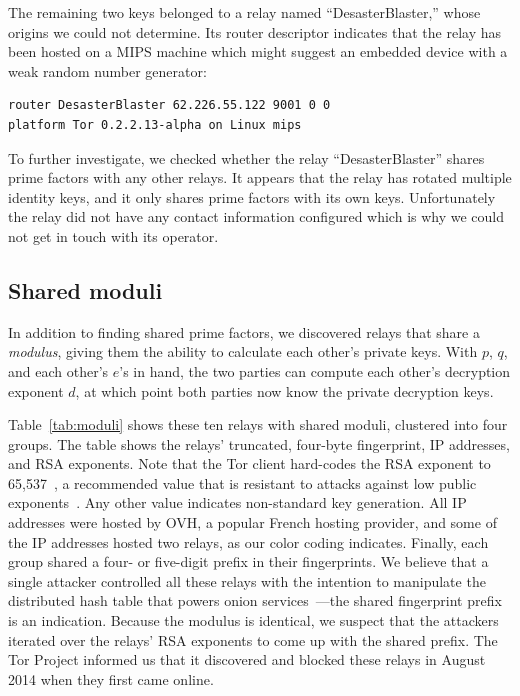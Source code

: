 The remaining two keys belonged to a relay named ``Desaster\-Blaster,'' whose
origins we could not determine. Its router descriptor indicates that the relay
has been hosted on a MIPS machine which might suggest an embedded device with a
weak random number generator:

\begin{verbatim}
router DesasterBlaster 62.226.55.122 9001 0 0
platform Tor 0.2.2.13-alpha on Linux mips
\end{verbatim}

To further investigate, we checked whether the relay ``Desaster\-Blaster'' shares
prime factors with any other relays. It appears that the relay has rotated
multiple identity keys, and it only shares prime factors with its own keys.
Unfortunately the relay did not have any contact information configured which is
why we could not get in touch with its operator.


\subsection{Shared moduli}
\label{sec:shared-moduli}
In addition to finding shared prime factors, we discovered relays that share a
\emph{modulus}, giving them the ability to calculate each other's private keys.
With $p$, $q$, and each other's $e$'s in hand, the two parties can compute
each other's decryption exponent $d$, at which point both parties now know the
private decryption keys.

Table~\ref{tab:moduli} shows these ten relays with shared moduli, clustered into
four groups. The table shows the relays' truncated, four-byte fingerprint, IP
addresses, and RSA exponents.  Note that the Tor client hard-codes the RSA
exponent to 65,537~\cite[\S~0.3]{torspec}, a recommended value that is resistant
to attacks against low public exponents~\cite[\S~4]{Boneh1999a}.  Any other
value indicates non-standard key generation.  All IP addresses were hosted by
OVH, a popular French hosting provider, and some of the IP addresses hosted two
relays, as our color coding indicates.  Finally, each group shared a four- or
five-digit prefix in their fingerprints.  We believe that a single attacker
controlled all these relays with the intention to manipulate the distributed
hash table that powers onion services~\cite{Biryukov2013a}---the shared
fingerprint prefix is an indication.  Because the modulus is identical, we suspect
that the attackers iterated over the relays' RSA exponents to come up with the
shared prefix.  The Tor Project informed us that it discovered and blocked these
relays in August 2014 when they first came online.

